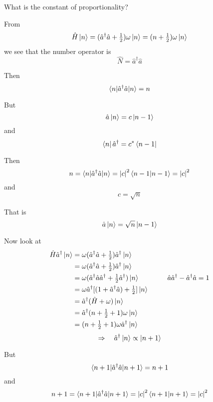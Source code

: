 \documentclass{article}
\begin{document}
\noindent What is the constant of proportionality?


\noindent From
\begin{equation}
\hat{H} \ket{n} = ( \hat{a}^\dagger \hat{a} + \tfrac{1}{2} ) \omega \ket{n} = ( n + \tfrac{1}{2} ) \omega \ket{n}
\end{equation}
we see that the number operator is
\begin{equation}
\hat{N} = \hat{a}^\dagger \hat{a}
\end{equation}

\noindent Then
\begin{equation}
\braket{ n | \hat{a}^\dagger \hat{a} | n } = n
\end{equation}

\noindent But
\begin{equation}
\hat{a} \ket{n} = c \ket{n-1}
\end{equation}
and
\begin{equation}
\bra{n} \hat{a}^\dagger = c^* \bra{n-1}
\end{equation}

\noindent Then
\begin{equation}
n = \braket{ n | \hat{a}^\dagger \hat{a} | n } = {|c|}^2 \braket{ n-1 | n-1 } = {|c|}^2
\end{equation}
and
\begin{equation}
c = \sqrt{n}
\end{equation}


\noindent That is
\begin{equation}
\hat{a} \ket{n} = \sqrt{n} \ket{n-1}
\end{equation}

\noindent Now look at
\begin{align}
\hat{H} \hat{a}^\dagger \ket{n} &= \omega ( \hat{a}^\dagger \hat{a} + \tfrac{1}{2} ) \hat{a}^\dagger \ket{n} \nonumber\\
&= \omega ( \hat{a}^\dagger \hat{a} + \tfrac{1}{2} ) \hat{a}^\dagger \ket{n} \nonumber\\
&= \omega ( \hat{a}^\dagger \hat{a} \hat{a}^\dagger + \tfrac{1}{2} \hat{a}^\dagger ) \ket{n} \qquad \qquad \hat{a} \hat{a}^\dagger - \hat{a}^\dagger \hat{a} = 1 \nonumber \\
&= \omega \hat{a}^\dagger [ ( 1 + \hat{a}^\dagger \hat{a} ) + \tfrac{1}{2} ] \ket{n} \nonumber \\
&= \hat{a}^\dagger ( \hat{H} + \omega ) \ket{n} \nonumber \\
&= \hat{a}^\dagger ( n + \tfrac{1}{2} + 1 ) \omega \ket{n} \nonumber \\
&= ( n + \tfrac{1}{2} + 1 ) \omega \hat{a}^\dagger \ket{n}
\end{align}
\begin{equation}
\Rightarrow \quad \hat{a}^\dagger \ket{n} \propto \ket{n+1}
\end{equation}


\noindent But
\begin{equation}
\braket{ n+1 | \hat{a}^\dagger \hat{a} | n+1 } = n + 1
\end{equation}
and
\begin{equation}
n + 1 = \braket{ n+1 | \hat{a}^\dagger \hat{a} | n+1 } = {|c|}^2 \braket{ n+1 | n+1 } = {|c|}^2
\end{equation}
\end{document}

